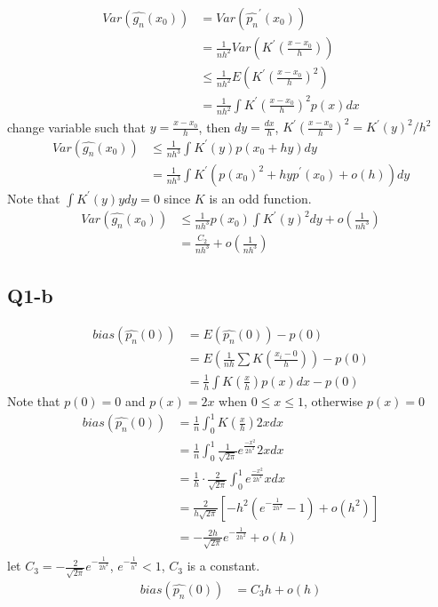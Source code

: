 \documentclass[12pt,letterpaper]{article}
\let\hat\widehat
\begin{document}
\begin{align*}
Var(\hat{g_n} (x_0)) &= Var(\hat{p_n}^{\prime} (x_0)) \\
&= \frac{1}{nh^2}Var(K^{\prime}(\frac{x - x_0}{h})) \\
&\leq  \frac{1}{nh^2} E(K^{\prime}(\frac{x-x_0}{h})^2) \\
&= \frac{1}{nh^2} \int K^{\prime}(\frac{x-x_0}{h})^2 p(x) dx
\end{align*}
\noindent change variable such that $y = \frac{x-x_0}{h}$, then $dy = \frac{dx}{h}$, $K^{\prime}(\frac{x-x_0}{h})^2 = K^{\prime}(y)^2/h^2$
\begin{align*}
Var(\hat{g_n} (x_0)) &\leq \frac{1}{nh^3} \int K^{\prime}(y) p(x_0 + hy) dy\\
&= \frac{1}{nh^3} \int K^{\prime}(p(x_0)^2 + hyp^{\prime} (x_0) + o(h)) dy 
\end{align*}
\noindent Note that $ \int K^{\prime}(y) y dy = 0$ since $K$ is an odd function.
\begin{align*}
Var(\hat{g_n} (x_0)) &\leq \frac{1}{nh^3} p(x_0) \int K^{\prime}(y)^2 dy + o(\frac{1}{nh^3}) \\
&= \frac{C_2}{nh^3} + o(\frac{1}{nh^3})
\end{align*}

\subsection*{Q1-b}
\begin{align*}
bias(\hat{p_n}(0)) &= E(\hat{p_n}(0)) - p(0) \\
&= E(\frac{1}{nh} \sum K(\frac{x_i - 0}{h})) - p(0) \\
&= \frac{1}{h} \int K(\frac{x}{h}) p(x) dx - p(0)
\end{align*}
\noindent Note that $p(0) = 0$ and $p(x) = 2x$ when $0 \leq x \leq 1$, otherwise $p(x) = 0$
\begin{align*}
bias(\hat{p_n}(0)) &= \frac{1}{n} \int_{0}^{1} K(\frac{x}{h}) 2x dx \\
&= \frac{1}{n} \int_{0}^{1} \frac{1}{\sqrt{2 \pi}} e^{\frac{-x^2}{2h^2}} 2x dx \\
&= \frac{1}{h} \cdot \frac{2}{\sqrt{2 \pi}} \int_{0}^{1} e^{\frac{-x^2}{2h^2}}  x dx \\
&= \frac{2}{h \sqrt{2 \pi}} [-h^2 (e^{-\frac{1}{2h^2}} - 1) + o(h^2)] \\
&= -\frac{2h}{\sqrt{2\pi}}e^{-\frac{1}{2h^2}} + o(h) \\
\end{align*}
\noindent  let $C_3 = -\frac{2}{\sqrt{2\pi}}e^{-\frac{1}{2h^2}}$, $e^{-\frac{1}{h^2}} < 1$, $C_3$ is a constant. 
\begin{align*}
bias(\hat{p_n}(0)) &= C_3 h + o(h)
\end{align*}
\end{document}
